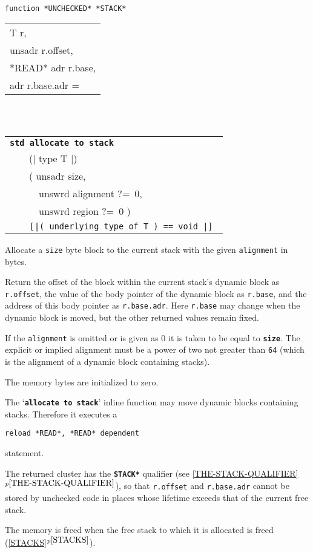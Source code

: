 \documentclass[12pt]{article}
\makeatletter
\newcommand{\TT}[1]{{\tt \bfseries #1}}
\newcommand{\ttstdkey}[1]{\TT{std #1}\index{#1@{\tt std #1}}}
\newcommand{\itemref}[1]{\ref{#1}$^{p\pageref{#1}}$}
\newcommand{\TS}{\hspace*{0in}\tt}
\newenvironment{indpar}[1][0.3in]%
	{\begin{list}{}%
		     {\setlength{\itemsep}{0in}%
		      \setlength{\topsep}{0in}%
		      \setlength{\parsep}{1ex}%
		      \setlength{\labelwidth}{#1}%
		      \setlength{\leftmargin}{#1}%
		      \addtolength{\leftmargin}{\labelsep}}%
	 \item}%
	{\end{list}}
\makeatother
\begin{document}
\begin{indpar}

{\tt function *UNCHECKED* *STACK* \begin{tabular}[t]{@{}l@{}}
                                  T r, \\
				  unsadr r.offset, \\
				  *READ* adr r.base, \\
				  adr r.base.adr = \\
				  \end{tabular} \\
\TS~~~~\begin{tabular}[t]{@{}l@{}}
       \ttstdkey{allocate to stack} \label{ALLOCATE-TO-STACK} \\
       ~~~~(| type T |) \\
       ~~~~( unsadr size, \\
       ~~~~~~unswrd alignment ?=~0, \\
       ~~~~~~unswrd region ?=~0 ) \\
\TS~~~~[|( underlying type of T ) == void |] \\
       \end{tabular}}

\begin{indpar}
Allocate a {\tt size} byte block to the current stack with the given
{\tt alignment} in bytes.

Return the offset of the block within the current stack's dynamic
block as {\tt r.offset},
the value of the body pointer of the dynamic block as {\tt r.base},
and the address of this body pointer as {\tt r.base.adr}.
Here {\tt r.base} may change when the dynamic block is moved, but the other
returned values remain fixed.

If the {\tt alignment} is omitted or is given as 0 it is taken
to be equal to \TT{size}.  The explicit or implied
alignment must be a power of two not greater than {\tt 64}
(which is the alignment of a dynamic block containing stacks).

The memory bytes are initialized to zero.

The `\TT{allocate to stack}' inline function may move dynamic blocks
containing stacks.
Therefore it executes a
\begin{center}
{\tt reload *READ*, *READ* dependent}
\end{center}
statement.

The returned cluster has
the \TT{*STACK*} qualifier (see \itemref{THE-STACK-QUALIFIER}),
so that {\tt r.offset} and {\tt r.base.adr} cannot be
stored by unchecked code in places whose lifetime exceeds that of the current
free stack.

The memory is freed when the free stack to which it is allocated
is freed (\itemref{STACKS}).
\end{indpar}

\end{indpar}
\end{document}

